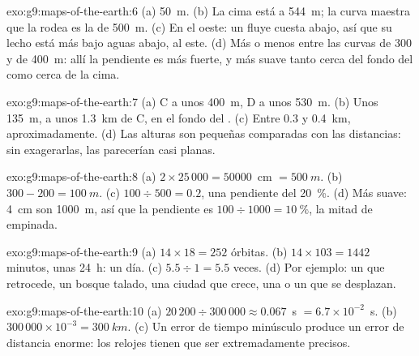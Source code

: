 \begin{solution}{exo:g9:maps-of-the-earth:6}
(a) \qty{50}{m}. (b) La cima está a \qty{544}{m}; la curva maestra que la
rodea es la de \qty{500}{m}. (c) En el oeste: un  fluye cuesta abajo,
así que su lecho está más bajo aguas abajo, al este. (d) Más o menos entre
las curvas de 300 y de \qty{400}{m}: allí la pendiente es más fuerte, y
más suave tanto cerca del fondo del  como cerca de la cima.
\end{solution}

\begin{solution}{exo:g9:maps-of-the-earth:7}
(a) C a unos \qty{400}{m}, D a unos \qty{530}{m}. (b) Unos
\qty{135}{m}, a unos \qty{1.3}{km} de C, en el fondo del . (c) Entre
0.3 y \qty{0.4}{km}, aproximadamente. (d) Las alturas son pequeñas
comparadas con las distancias: sin exagerarlas, las  parecerían
casi planas.
\end{solution}

\begin{solution}{exo:g9:maps-of-the-earth:8}
(a) $2 \times 25\,000 = \num{50000}$~cm $= \qty{500}{m}$. (b) $300 - 200 =
\qty{100}{m}$. (c) $100 \div 500 = 0.2$, una pendiente del \qty{20}{\%}.
(d) Más suave: \qty{4}{cm} son \qty{1000}{m}, así que la pendiente es
$100 \div 1000 = \qty{10}{\%}$, la mitad de empinada.
\end{solution}

\begin{solution}{exo:g9:maps-of-the-earth:9}
(a) $14 \times 18 = 252$ órbitas. (b) $14 \times 103 = 1442$ minutos, unas
\qty{24}{h}: un día. (c) $5.5 \div 1 = 5.5$ veces. (d) Por ejemplo: un
 que retrocede, un bosque talado, una ciudad que crece, una  o
un  que se desplazan.
\end{solution}

\begin{solution}{exo:g9:maps-of-the-earth:10}
(a) $20\,200 \div 300\,000 \approx 0.067$~s $= 6.7 \times 10^{-2}$~s.
(b) $300\,000 \times 10^{-3} = \qty{300}{km}$. (c) Un error de tiempo
minúsculo produce un error de distancia enorme: los relojes tienen que ser
extremadamente precisos.
\end{solution}

